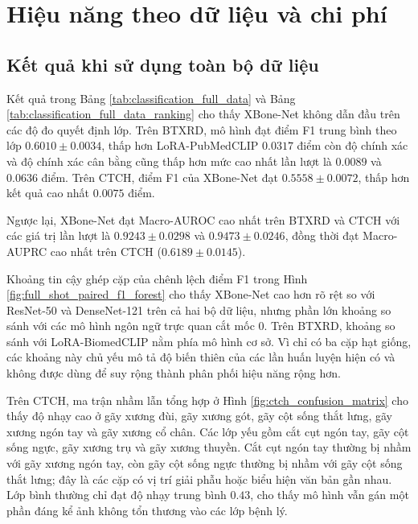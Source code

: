 \section{Hiệu năng theo dữ liệu và chi phí}
\label{sec:data_cost_performance}

\subsection{Kết quả khi sử dụng toàn bộ dữ liệu}
Kết quả trong Bảng \ref{tab:classification_full_data} và Bảng \ref{tab:classification_full_data_ranking} cho thấy XBone-Net không dẫn đầu trên các độ đo quyết định lớp. Trên BTXRD, mô hình đạt điểm F1 trung bình theo lớp $0{.}6010\pm0{.}0034$, thấp hơn LoRA-PubMedCLIP $0{.}0317$ điểm còn độ chính xác và độ chính xác cân bằng cũng thấp hơn mức cao nhất lần lượt là $0{.}0089$ và $0{.}0636$ điểm. Trên CTCH, điểm F1 của XBone-Net đạt $0{.}5558\pm0{.}0072$, thấp hơn kết quả cao nhất $0{.}0075$ điểm.

Ngược lại, XBone-Net đạt Macro-AUROC cao nhất trên BTXRD và CTCH với các giá trị lần lượt là $0{.}9243\pm0{.}0298$ và $0{.}9473\pm0{.}0246$, đồng thời đạt Macro-AUPRC cao nhất trên CTCH ($0{.}6189\pm0{.}0145$).





Khoảng tin cậy ghép cặp của chênh lệch điểm F1 trong Hình \ref{fig:full_shot_paired_f1_forest} cho thấy XBone-Net cao hơn rõ rệt so với ResNet-50 và DenseNet-121 trên cả hai bộ dữ liệu, nhưng phần lớn khoảng so sánh với các mô hình ngôn ngữ trực quan cắt mốc 0. Trên BTXRD, khoảng so sánh với LoRA-BiomedCLIP nằm phía mô hình cơ sở. Vì chỉ có ba cặp hạt giống, các khoảng này chủ yếu mô tả độ biến thiên của các lần huấn luyện hiện có và không được dùng để suy rộng thành phân phối hiệu năng rộng hơn.

Trên CTCH, ma trận nhầm lẫn tổng hợp ở Hình \ref{fig:ctch_confusion_matrix} cho thấy độ nhạy cao ở gãy xương đùi, gãy xương gót, gãy cột sống thắt lưng, gãy xương ngón tay và gãy xương cổ chân. Các lớp yếu gồm cắt cụt ngón tay, gãy cột sống ngực, gãy xương trụ và gãy xương thuyền. Cắt cụt ngón tay thường bị nhầm với gãy xương ngón tay, còn gãy cột sống ngực thường bị nhầm với gãy cột sống thắt lưng; đây là các cặp có vị trí giải phẫu hoặc biểu hiện văn bản gần nhau. Lớp bình thường chỉ đạt độ nhạy trung bình $0{.}43$, cho thấy mô hình vẫn gán một phần đáng kể ảnh không tổn thương vào các lớp bệnh lý.

